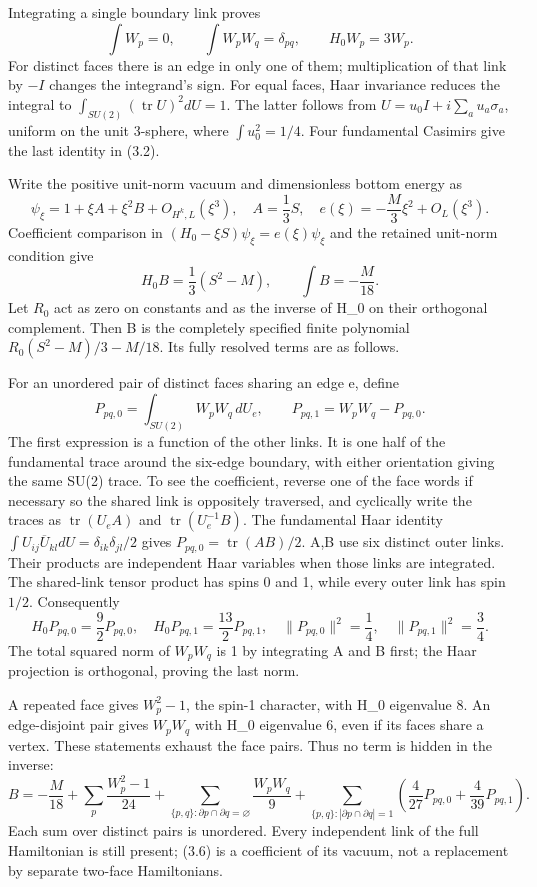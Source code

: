 \documentclass[
  11pt,
]{article}
\begin{document}
Integrating a single boundary link proves \[
 \int W_p=0,\qquad \int W_pW_q=\delta_{pq},\qquad H_0W_p=3W_p.
\tag{3.2}
\] For distinct faces there is an edge in only one of them;
multiplication of that link by \(-I\) changes the integrand's sign. For
equal faces, Haar invariance reduces the integral to
\(\int_{SU(2)}(\operatorname{tr}U)^2dU=1\). The latter follows from
\(U=u_0I+i\sum_au_a\sigma_a\), uniform on the unit 3-sphere, where
\(\int u_0^2=1/4\). Four fundamental Casimirs give the last identity in
(3.2).

Write the positive unit-norm vacuum and dimensionless bottom energy as
\[
 \psi_\xi=1+\xi A+\xi^2B+O_{H^k,L}(\xi^3),\quad
 A=\frac13S,\quad e(\xi)=-\frac M3\xi^2+O_L(\xi^3).
\] Coefficient comparison in \((H_0-\xi S)\psi_\xi=e(\xi)\psi_\xi\) and
the retained unit-norm condition give \[
 H_0B=\frac13(S^2-M),\qquad \int B=-\frac M{18}.
\tag{3.3}
\] Let \(R_0\) act as zero on constants and as the inverse of H\_0 on
their orthogonal complement. Then B is the completely specified finite
polynomial \(R_0(S^2-M)/3-M/18\). Its fully resolved terms are as
follows.

For an unordered pair of distinct faces sharing an edge e, define \[
 P_{pq,0}=\int_{SU(2)}W_pW_q\,dU_e,\qquad
 P_{pq,1}=W_pW_q-P_{pq,0}.
\tag{3.4}
\] The first expression is a function of the other links. It is one half
of the fundamental trace around the six-edge boundary, with either
orientation giving the same SU(2) trace. To see the coefficient, reverse
one of the face words if necessary so the shared link is oppositely
traversed, and cyclically write the traces as
\(\operatorname{tr}(U_eA)\) and \(\operatorname{tr}(U_e^{-1}B)\). The
fundamental Haar identity
\(\int U_{ij}\overline{U}_{kl}dU=\delta_{ik}\delta_{jl}/2\) gives
\(P_{pq,0}=\operatorname{tr}(AB)/2\). A,B use six distinct outer links.
Their products are independent Haar variables when those links are
integrated. The shared-link tensor product has spins 0 and 1, while
every outer link has spin \(1/2\). Consequently \[
 H_0P_{pq,0}=\frac92P_{pq,0},\quad
 H_0P_{pq,1}=\frac{13}2P_{pq,1},\quad
 \|P_{pq,0}\|^2=\frac14,\quad \|P_{pq,1}\|^2=\frac34.
\tag{3.5}
\] The total squared norm of \(W_pW_q\) is 1 by integrating A and B
first; the Haar projection is orthogonal, proving the last norm.

A repeated face gives \(W_p^2-1\), the spin-1 character, with H\_0
eigenvalue 8. An edge-disjoint pair gives \(W_pW_q\) with H\_0
eigenvalue 6, even if its faces share a vertex. These statements exhaust
the face pairs. Thus no term is hidden in the inverse: \[
 \boxed{B=-\frac M{18}
 +\sum_p\frac{W_p^2-1}{24}
 +\sum_{\{p,q\}:\partial p\cap\partial q=\varnothing}\frac{W_pW_q}{9}
 +\sum_{\{p,q\}:|\partial p\cap\partial q|=1}
       \left(\frac4{27}P_{pq,0}+\frac4{39}P_{pq,1}\right).}
\tag{3.6}
\] Each sum over distinct pairs is unordered. Every independent link of
the full Hamiltonian is still present; (3.6) is a coefficient of its
vacuum, not a replacement by separate two-face Hamiltonians.
\end{document}
